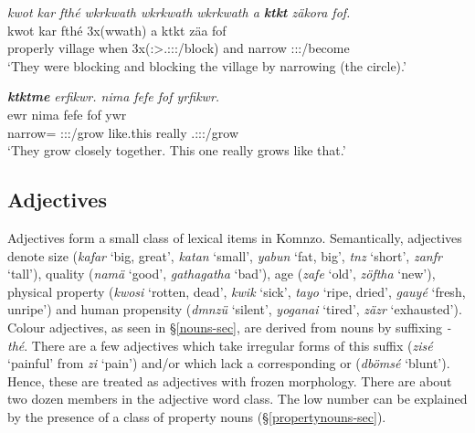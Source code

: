 \begin{exe}
	\ex \emph{kwot kar fthé wkrkwath wkrkwath wkrkwath a \textbf{ktkt} zäkora fof.}\\
	\gll kwot kar fthé 3x(wwath) a {ktkt} zäa fof\\
	properly village when 3x(\Stpl:\Sbj>\Tsg.\F:\Obj:\Pst:\Ipfv/block) and narrow \Stsg:\Sbj:\Pst:\Pfv/become {\Emph}\\
	\trans `They were blocking and blocking the village by narrowing (the circle).'\\ 
	\label{ex033}
\end{exe}
\begin{exe}
	\ex \emph{\textbf{ktktme} erfikwr. nima fefe fof yrfikwr.}\\
	 ewr nima fefe fof ywr\\
	narrow={\Ins} \Stpl:\Sbj:\Nonpast:\Ipfv/grow like.this really {\Emph} \Tsg.\Masc:\Sbj:\Nonpast:\Ipfv/grow\\
	\trans `They grow closely together. This one really grows like that.'\\ 
	\label{ex034}
\end{exe}

\subsection{Adjectives} \label{adjectives-sec}

Adjectives form a small class of lexical items in Komnzo. Semantically, adjectives denote size (\emph{kafar} `big, great', \emph{katan} `small', \emph{yabun} `fat, big', \emph{tnz} `short', \emph{zanfr} `tall'), quality (\emph{namä} `good', \emph{gathagatha} `bad'), age (\emph{zafe} `old', \emph{zöftha} `new'), physical property (\emph{kwosi} `rotten, dead', \emph{kwik} `sick', \emph{tayo} `ripe, dried', \emph{gauyé} `fresh, unripe') and human propensity (\emph{dmnzü} `silent', \emph{yoganai} `tired', \emph{zäzr} `exhausted'). Colour adjectives, as seen in {\S}\ref{nouns-sec}, are derived from nouns by suffixing \emph{-thé}. There are a few adjectives which take irregular forms of this suffix (\emph{zisé} `painful' from \emph{zi} `pain') and/or which lack a corresponding  or  (\emph{dbömsé} `blunt'). Hence, these are treated as adjectives with frozen morphology. There are about two dozen members in the adjective word class. The low number can be explained by the presence of a class of property nouns ({\S}\ref{propertynouns-sec}).

